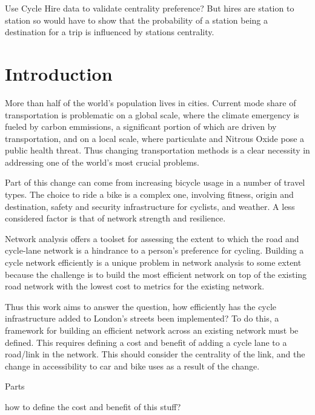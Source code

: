 \documentclass[11pt]{article} %
\begin{document}
Use Cycle Hire data to validate centrality preference?
	But hires are station to station so would have to show that the probability of a station being a destination for a trip is influenced by stations centrality. 


	
	









\section{Introduction}

	More than half of the world's population lives in cities. Current mode share of transportation is problematic on a global scale, where the climate emergency is fueled by carbon emmissions, a significant portion of which are driven by transportation, and on a local scale, where particulate and Nitrous Oxide pose a public health threat. Thus changing transportation methods is a clear necessity in addressing one of the world's most crucial problems. 
	
	Part of this change can come from increasing bicycle usage in a number of travel types. The choice to ride a bike is a complex one, involving fitness, origin and destination, safety and security infrastructure for cyclists, and weather. A less considered factor is that of network strength and resilience.
	
	Network analysis offers a toolset for assessing the extent to which the road and cycle-lane network is a hindrance to a person's preference for cycling. Building a cycle network efficiently is a unique problem in network analysis to some extent because the challenge is to build the most efficient network on top of the existing road network with the lowest cost to metrics for the existing network. 
	
	Thus this work aims to answer the question, how efficiently has the cycle infrastructure added to London's streets been implemented? To do this, a framework for building an efficient network across an existing network must be defined. This requires defining a cost and benefit of adding a cycle lane to a road/link in the network. This should consider the centrality of the link, and the change in accessibility to car and bike uses as a result of the change.
	
	Parts
	
how to define the cost and benefit of this stuff?
\end{document}
